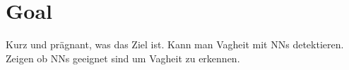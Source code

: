 \section{Goal}
\label{chp:study:sec:study_goal}
Kurz und prägnant, was das Ziel ist.
Kann man Vagheit mit NNs detektieren.
Zeigen ob \acp{NN} geeignet sind um Vagheit zu erkennen.
